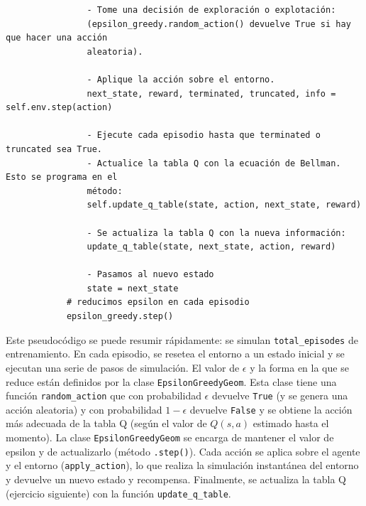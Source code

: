 \documentclass{article}
\begin{document}
\begin{exercise}
\begin{small}
\begin{verbatim}
                - Tome una decisión de exploración o explotación: 
                (epsilon_greedy.random_action() devuelve True si hay que hacer una acción 
                aleatoria).
                
                - Aplique la acción sobre el entorno.
                next_state, reward, terminated, truncated, info = self.env.step(action)
            
                - Ejecute cada episodio hasta que terminated o truncated sea True.
                - Actualice la tabla Q con la ecuación de Bellman. Esto se programa en el
                método:
                self.update_q_table(state, action, next_state, reward)
               
                - Se actualiza la tabla Q con la nueva información:
                update_q_table(state, next_state, action, reward)
                
                - Pasamos al nuevo estado
                state = next_state
            # reducimos epsilon en cada episodio
            epsilon_greedy.step()
\end{verbatim}
\end{small}
\end{exercise}

Este pseudocódigo se puede resumir rápidamente: se simulan \texttt{total\_episodes} de entrenamiento. En cada episodio, se resetea el entorno a un estado inicial y se ejecutan una serie de pasos de simulación. El valor de $\epsilon$ y la forma en la que se reduce están definidos por la clase \texttt{EpsilonGreedyGeom}. Esta clase tiene una función \texttt{random\_action} que con probabilidad $\epsilon$ devuelve \texttt{True} (y se genera una acción aleatoria) y con probabilidad $1-\epsilon$ devuelve \texttt{False} y se obtiene la acción más adecuada de la tabla Q (según el valor de $Q(s,a)$ estimado hasta el momento). La clase \texttt{EpsilonGreedyGeom} se encarga de mantener el valor de epsilon y de actualizarlo (método \texttt{.step()}).  Cada acción se aplica sobre el agente y el entorno (\texttt{apply\_action}), lo que realiza la simulación instantánea del entorno y devuelve un nuevo estado y recompensa. Finalmente, se actualiza la tabla Q (ejercicio siguiente) con la función \texttt{update\_q\_table}. 

\end{document}
